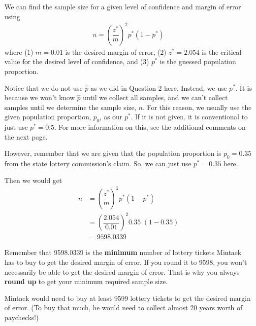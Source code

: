 \documentclass[12pt]{article}
\begin{document}
We can find the sample size for a given level of confidence and margin of error using
\begin{align*}
n = \left( \dfrac{z^*}{m} \right)^2 p^* (1 - p^*)
\end{align*}
where (1) $m = 0.01$ is the desired margin of error, (2) $z^* = 2.054$ is the critical value for the desired level of confidence, and (3) $p^*$ is the guessed population proportion.

Notice that we do not use $\hat{p}$ as we did in Question 2 here. Instead, we use $p^*$. It is because we won't know $\hat{p}$ until we collect all samples, and we can't collect samples until we determine the sample size, $n$. For this reason, we usually use the given population proportion, $p_0$, as our $p^*$. If it is not given, it is conventional to just use $p^* = 0.5$. For more information on this, see the additional comments on the next page.

However, remember that we are given that the population proportion is $p_0 = 0.35$ from the state lottery commission's claim. So, we can just use $p^* = 0.35$ here.

Then we would get
\begin{align*}
n &= \left( \dfrac{z^*}{m} \right)^2 p^* (1 - p^*) \\
&= \left( \dfrac{2.054}{0.01} \right)^2 0.35 \; (1 - 0.35) \\
&= 9598.0339
\end{align*}

Remember that 9598.0339 is the \textbf{minimum} number of lottery tickets Mintaek has to buy to get the desired margin of error. If you round it to 9598, you won't necessarily be able to get the desired margin of error. That is why you always \textbf{round up} to get your minimum required sample size.

Mintaek would need to buy at least 9599 lottery tickets to get the desired margin of error. (To buy that much, he would need to collect almost 20 years worth of paychecks!)

\pagebreak
\end{document}
